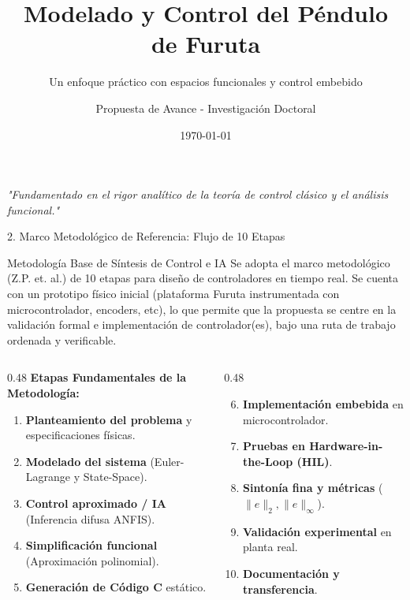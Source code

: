 \documentclass[10pt,aspectratio=169]{beamer}
\title[Control del Péndulo de Furuta]{Modelado y Control del Péndulo de Furuta}
\subtitle{Un enfoque práctico con espacios funcionales y control embebido}
\author[Propuesta Doctoral]{Propuesta de Avance - Investigación Doctoral}
\institute[Control y Matemáticas Aplicadas]{Reunión 1 - Comité tutorial}
\date{\today}
\begin{document}
\begin{frame}
  \titlepage
  \begin{center}
    \small \textit{"Fundamentado en el rigor analítico de la teoría de control clásico y el análisis funcional."}
  \end{center}
\end{frame}

\begin{frame}{2. Marco Metodológico de Referencia: Flujo de 10 Etapas}
  \begin{block}{Metodología Base de Síntesis de Control e IA}
    Se adopta el marco metodológico (Z.P. et. al.) de 10 etapas para diseño de controladores en tiempo real.
 Se cuenta con un prototipo físico inicial (plataforma Furuta instrumentada con microcontrolador, encoders, etc), lo que permite que la propuesta se centre en la validación formal e implementación de controlador(es),  bajo una ruta de trabajo ordenada y verificable.
  \end{block}
  
  \vspace{0.2cm}
  \begin{columns}[T]
    \begin{column}{0.48\textwidth}
      \textbf{Etapas Fundamentales de la Metodología:}
      \begin{enumerate}
        \setcounter{enumi}{0}
        \item \small \textbf{Planteamiento del problema} y especificaciones físicas.
        \item \small \textbf{Modelado del sistema} (Euler-Lagrange y State-Space).
        \item \small \textbf{Control aproximado / IA} (Inferencia difusa ANFIS).
        \item \small \textbf{Simplificación funcional} (Aproximación polinomial).
        \item \small \textbf{Generación de Código C} estático.
      \end{enumerate}
    \end{column}
    \begin{column}{0.48\textwidth}
      \begin{enumerate}
        \setcounter{enumi}{5}
        \item \small \textbf{Implementación embebida} en microcontrolador.
        \item \small \textbf{Pruebas en Hardware-in-the-Loop (HIL)}.
        \item \small \textbf{Sintonía fina y métricas} ($\|e\|_2, \|e\|_\infty$).
        \item \small \textbf{Validación experimental} en planta real.
        \item \small \textbf{Documentación y transferencia}.
      \end{enumerate}
    \end{column}
  \end{columns}
\end{frame}
\end{document}
